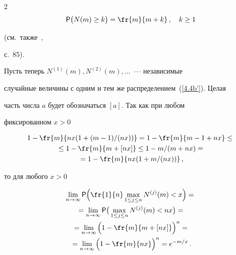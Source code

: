 \begin{multicols}{2}
\begin{equation}


{\sf P}\big(N(m)\ge


k\big)=\fr{m}{m+k}\,,\quad k\ge1


\label{4.4b'}


\end{equation}


(см.\ также~\cite{15be},


с.~85).





Пусть теперь $N^{(1)}(m),N^{(2)}(m),\ldots$~--- независимые


случайные величины с одним и тем же распределением~(\ref{4.4b'}). Целая


часть числа $a$ будет обозначаться $[a]$. Так как при любом


фиксированном $x>0$





\noindent


\begin{multline*}


1-\fr{m}{nx(1+(m-1)/(nx))}=


1-\fr{m}{m-1+nx}\le{}\\


{}\le  1-\fr{m}{m+[nx]}\le 1-m/(m+nx)={}\\


{}= 1-\fr{m}{nx(1+m/(nx))}\,,


\end{multline*}


то для любого $x>0$


\begin{multline*}


\lim_{n\to\infty}{\sf P}\Big(\fr{1}{n}\max_{1\le j\le


n}N^{(j)}(m)<x\Big)={}\\


{}= \lim_{n\to\infty}{\sf P}\big(\max_{1\le j\le


n}N^{(j)}(m)<nx\big)= {}\\


{}=\lim_{n\to\infty}\Big(1-\fr{m}{m+[nx]}\Big)^n={}\\


{}=\lim_{n\to\infty}\Big(1-


\fr{m}{nx}\Big)^n=e^{-m/x}\,.


\end{multline*}



\end{multicols}

